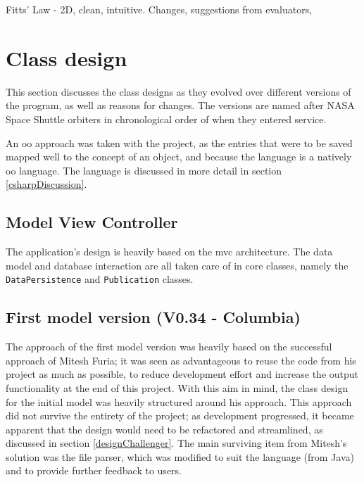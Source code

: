 Fitts' Law - 2D, clean, intuitive. Changes, suggestions from evaluators, 

\section{Class design}
This section discusses the class designs as they evolved over different versions of the program, as well as reasons for changes.  The versions are named after NASA Space Shuttle orbiters in chronological order of when they entered service.

An \gls{oo} approach was taken with the project, as the entries that were to be saved mapped well to the concept of an object, and because the \cs{} language is a natively \gls{oo} language.  The \cs{} language is discussed in more detail in section \ref{csharpDiscussion}.

\subsection{Model View Controller}
The application's design is heavily based on the \gls{mvc} architecture.  The data model and database interaction are all taken care of in core classes, namely the \texttt{DataPersistence} and \texttt{Publication} classes.

\subsection{First model version (V0.34 - Columbia)}
\label{columbia}
The approach of the first model version was heavily based on the successful approach of Mitesh Furia; it was seen as advantageous to reuse the code from his project as much as possible, to reduce development effort and increase the output functionality at the end of this project.  With this aim in mind, the class design for the initial model was heavily structured around his approach.  This approach did not survive the entirety of the project; as development progressed, it became apparent that the design would need to be refactored and streamlined, as discussed in section \ref{designChallenger}.  The main surviving item from Mitesh's solution was the file parser, which was modified to suit the \cs{} language (from Java) and to provide further feedback to users.

